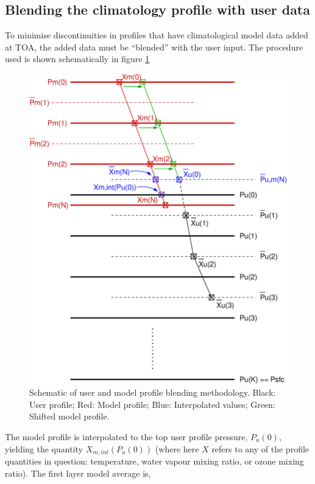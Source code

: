 \subsection{Blending the climatology profile with user data}
To minimise discontinuities in profiles that have climatological model data added at TOA, the added data must be ``blended'' with the user input. The procedure used is shown schematically in figure \ref{fig:blend_profile}
\begin{figure}[htp]
  \centering
  \includegraphics[scale=0.8]{graphics/blend_profile.eps}
  \caption{Schematic of user and model profile blending methodology. Black: User profile; Red: Model profile; Blue: Interpolated values; Green: Shifted model profile.}
  \label{fig:blend_profile}
\end{figure}
The model profile is interpolated to the top user profile pressure, $P_{u}(0)$, yielding the quantity $X_{m,int}\left(P_{u}(0)\right)$ (where here $X$ refers to any of the profile quantities in question: temperature, water vapour mixing ratio, or ozone mixing ratio). The first layer model average is,
